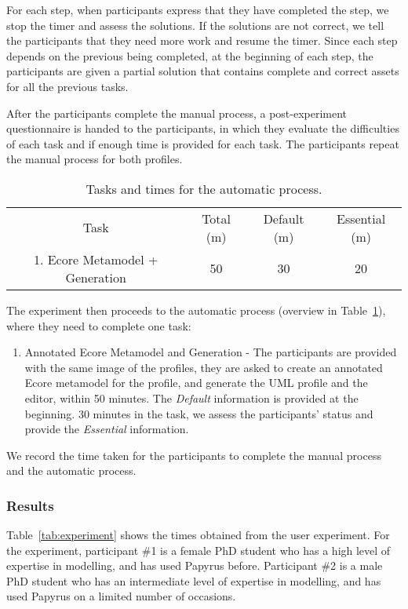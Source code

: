 For each step, when participants express that they have completed the step, we stop the timer and assess the solutions. 
If the solutions are not correct, we tell the participants that they need more work and resume the timer.
Since each step depends on the previous being completed, at the beginning of each step, the participants are given a partial solution that contains complete and correct assets for all the previous tasks.

After the participants complete the manual process, a post-experiment questionnaire is handed to the participants, in which they evaluate the difficulties of each task and if enough time is provided for each task.
The participants repeat the manual process for both profiles.

\begin{table}[ht!]
	\centering
	\setlength{\tabcolsep}{3.5pt} 
	\begin{tabular}{|c|c|c|c|}
		Task & Total (m) & Default (m) & Essential (m) \\ 
		1. Ecore Metamodel + Generation & 50 & 30 & 20 \\
	\end{tabular}
	\label{tab:automatic}
	\caption{Tasks and times for the automatic process.}
\end{table}


The experiment then proceeds to the automatic process (overview in Table~\ref{tab:automatic}), where they need to complete one task:
\begin{enumerate}
	\item Annotated Ecore Metamodel and Generation - The participants are provided with the same image of the profiles, they are asked to create an annotated Ecore metamodel for the profile, and generate the UML profile and the editor, within 50 minutes.
	The \textit{Default} information is provided at the beginning. 
	30 minutes in the task, we assess the participants' status and provide the \textit{Essential} information.
\end{enumerate}
We record the time taken for the participants to complete the manual process and the automatic process.



\subsubsection{Results}
Table~\ref{tab:experiment} shows the times obtained from the user experiment.
For the experiment, participant \#1 is a female PhD student who has a high level of expertise in modelling, and has used Papyrus before.
Participant \#2 is a male PhD student who has an intermediate level of expertise in modelling, and has used Papyrus on a limited number of occasions.

